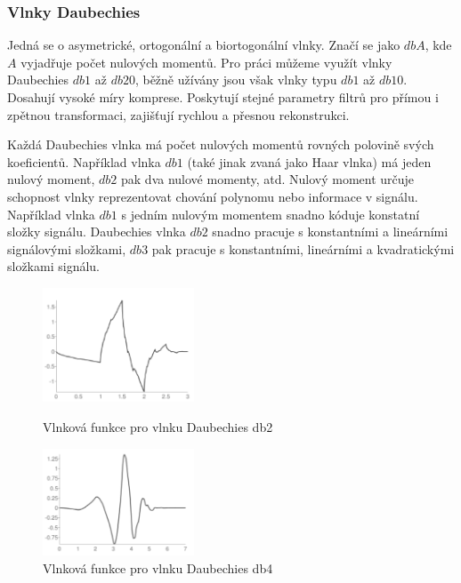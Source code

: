 \subsubsection{Vlnky Daubechies}

Jedná se o asymetrické, ortogonální a biortogonální vlnky. Značí se jako $dbA$, kde $A$ vyjadřuje počet nulových momentů. Pro práci můžeme využít vlnky Daubechies $db1$ až $db20$, běžně užívány jsou však vlnky typu $db1$ až $db10$. \cite{PyWaveletsBrowser} Dosahují vysoké míry komprese. Poskytují stejné parametry filtrů pro přímou i zpětnou transformaci, zajišťují rychlou a přesnou rekonstrukci. \cite{WaveletHlavac} 
    
Každá Daubechies vlnka má počet nulových momentů rovných polovině svých koeficientů. Například vlnka $db1$ (také jinak zvaná jako Haar vlnka) má jeden nulový moment, $db2$ pak dva nulové momenty, atd. Nulový moment určuje schopnost vlnky reprezentovat chování polynomu nebo informace v signálu. Například vlnka $db1$ s jedním nulovým momentem snadno kóduje konstatní složky signálu. Daubechies vlnka $db2$ snadno pracuje s konstantními a lineárními signálovými složkami, $db3$ pak pracuje s konstantními, lineárními a kvadratickými složkami signálu. \cite{WaveletsSignalImageProcessing}

\begin{figure}[!htbp]
  \begin{minipage}[b]{0.5\linewidth}
    \centering
    \includegraphics[width=170px]{obrazky-figures/db2wavelet.PNG}
    \caption{Vlnková funkce pro vlnku Daubechies db2 \cite{PyWaveletsBrowser}}
  \end{minipage}
  \hspace{0.5cm}
  \begin{minipage}[b]{0.5\linewidth}
    \centering
    \includegraphics[width=170px]{obrazky-figures/db4wavelet.PNG}
    \caption{Vlnková funkce pro vlnku Daubechies db4 \cite{PyWaveletsBrowser}}
  \end{minipage}
\end{figure}
    
